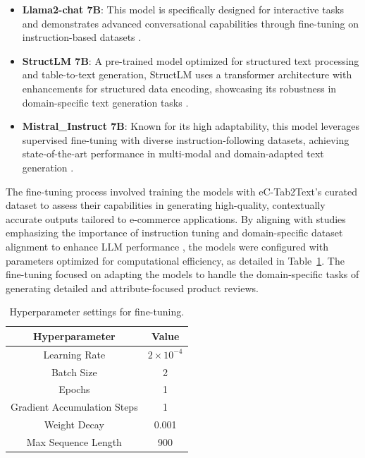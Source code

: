 \begin{itemize} 
    \item \textbf{Llama2-chat 7B}: This model is specifically designed for interactive tasks and demonstrates advanced conversational capabilities through fine-tuning on instruction-based datasets \citep{touvron2023llama}. 
    \item \textbf{StructLM 7B}: A pre-trained model optimized for structured text processing and table-to-text generation, StructLM uses a transformer architecture with enhancements for structured data encoding, showcasing its robustness in domain-specific text generation tasks \citep{zhuang2024structlm}. 
    \item \textbf{Mistral\_Instruct 7B}: Known for its high adaptability, this model leverages supervised fine-tuning with diverse instruction-following datasets, achieving state-of-the-art performance in multi-modal and domain-adapted text generation \citep{jiang2023mistral}. 
\end{itemize}

The fine-tuning process involved training the models with eC-Tab2Text's curated dataset to assess their capabilities in generating high-quality, contextually accurate outputs tailored to e-commerce applications. By aligning with studies emphasizing the importance of instruction tuning and domain-specific dataset alignment to enhance LLM performance \citep{Zhang2023InstructionTF, Chang2023ASO}, the models were configured with parameters optimized for computational efficiency, as detailed in Table~\ref{table:hyperparameters}. The fine-tuning focused on adapting the models to handle the domain-specific tasks of generating detailed and attribute-focused product reviews.

\begin{table}[ht]
    \centering
    \footnotesize
    \begin{tabular}{|c|c|}
    \hline
    \textbf{Hyperparameter} & \textbf{Value} \\
    \hline
    Learning Rate & $2 \times 10^{-4}$ \\
    Batch Size & 2 \\
    Epochs & 1 \\
    Gradient Accumulation Steps & 1 \\
    Weight Decay & 0.001 \\
    Max Sequence Length & 900 \\
    \hline
    \end{tabular}
    \caption{Hyperparameter settings for fine-tuning.}
    \label{table:hyperparameters}
\end{table}

